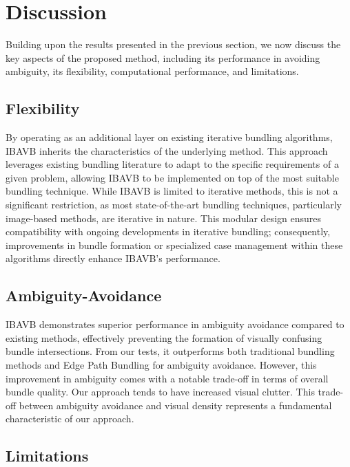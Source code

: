 
\section{Discussion}\label{sec:discussion}

Building upon the results presented in the previous section, we now discuss the key aspects of the proposed method, including its performance in avoiding ambiguity, its flexibility, computational performance, and limitations.

\subsection{Flexibility}

By operating as an additional layer on existing iterative bundling algorithms, IBAVB inherits the characteristics of the underlying method. This approach leverages existing bundling literature to adapt to the specific requirements of a given problem, allowing IBAVB to be implemented on top of the most suitable bundling technique. While IBAVB is limited to iterative methods, this is not a significant restriction, as most state-of-the-art bundling techniques, particularly image-based methods, are iterative in nature\cite{lhuillier:2017:survey}. This modular design ensures compatibility with ongoing developments in iterative bundling; consequently, improvements in bundle formation or specialized case management within these algorithms directly enhance IBAVB's performance.


\subsection{Ambiguity-Avoidance}

IBAVB demonstrates superior performance in ambiguity avoidance compared to existing methods, effectively preventing the formation of visually confusing bundle intersections. From our tests, it outperforms both traditional bundling methods and Edge Path Bundling for ambiguity avoidance. However, this improvement in ambiguity comes with a notable trade-off in terms of overall bundle quality. Our approach tends to have increased visual clutter. This trade-off between ambiguity avoidance and visual density represents a fundamental characteristic of our approach.

\subsection{Limitations}\label{sec:limitations}

